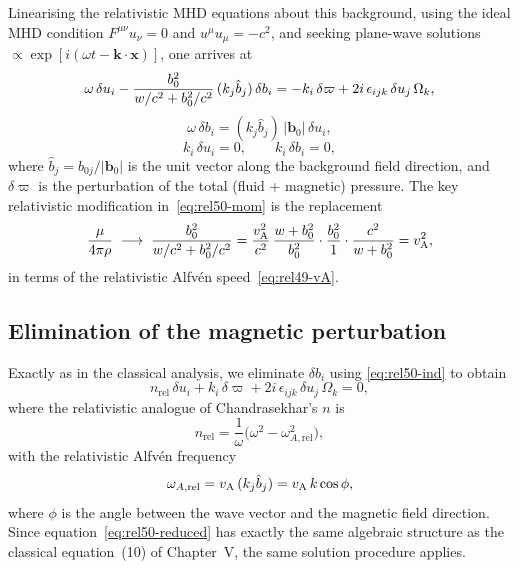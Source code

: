 Linearising the relativistic MHD equations about this background, using
the ideal MHD condition $F^{\mu\nu}u_{\nu}=0$ and
$u^{\mu}u_{\mu}=-c^{2}$, and seeking plane-wave solutions
$\propto\exp[i(\omega t - \mathbf{k}\cdot\mathbf{x})]$, one arrives at
\begin{equation}
  \omega\,\delta u_{i}
    - \frac{b_{0}^{2}}{w/c^{2}+b_{0}^{2}/c^{2}}
      \,(k_{j}\hat{b}_{j})\,\delta b_{i}
    = -k_{i}\,\delta\varpi
      + 2i\,\epsilon_{ijk}\,\delta u_{j}\,\Omega_{k},
  \label{eq:rel50-mom}
\end{equation}
\begin{equation}
  \omega\,\delta b_{i}
    = (k_{j}\hat{b}_{j})\,|\mathbf{b}_{0}|\,\delta u_{i},
  \label{eq:rel50-ind}
\end{equation}
\begin{equation}
  k_{i}\,\delta u_{i} = 0,
  \qquad
  k_{i}\,\delta b_{i} = 0,
  \label{eq:rel50-div}
\end{equation}
where $\hat{b}_{j}=b_{0j}/|\mathbf{b}_{0}|$ is the unit vector along
the background field direction, and
$\delta\varpi$ is the perturbation of the total (fluid + magnetic)
pressure.  The key relativistic modification in~\eqref{eq:rel50-mom} is
the replacement
\begin{equation}
  \frac{\mu}{4\pi\rho}
  \;\longrightarrow\;
  \frac{b_{0}^{2}}{w/c^{2}+b_{0}^{2}/c^{2}}
  = \frac{v_{\mathrm{A}}^{2}}{c^{2}}\,\frac{w+b_{0}^{2}}{b_{0}^{2}}\cdot
    \frac{b_{0}^{2}}{1} \cdot\frac{c^{2}}{w+b_{0}^{2}}
  = v_{\mathrm{A}}^{2},
  \label{eq:rel50-replacement}
\end{equation}
in terms of the relativistic Alfv\'en speed~\eqref{eq:rel49-vA}.

\subsection{Elimination of the magnetic perturbation}

Exactly as in the classical analysis, we eliminate $\delta b_{i}$ using
\eqref{eq:rel50-ind} to obtain
\begin{equation}
  n_{\mathrm{rel}}\,\delta u_{i}
    + k_{i}\,\delta\varpi
    + 2i\,\epsilon_{ijk}\,\delta u_{j}\,\Omega_{k} = 0,
  \label{eq:rel50-reduced}
\end{equation}
where the relativistic analogue of Chandrasekhar's $n$ is
\begin{equation}
  n_{\mathrm{rel}}
    = \frac{1}{\omega}
      \bigl(\omega^{2} - \omega_{A,\mathrm{rel}}^{2}\bigr),
  \label{eq:rel50-n}
\end{equation}
with the relativistic Alfv\'en frequency
\begin{equation}
  \omega_{A,\mathrm{rel}}
    = v_{\mathrm{A}}\,(k_{j}\hat{b}_{j})
    = v_{\mathrm{A}}\,k\cos\phi,
  \label{eq:rel50-omegaA}
\end{equation}
where $\phi$ is the angle between the wave vector and the magnetic field
direction.  Since equation~\eqref{eq:rel50-reduced} has exactly the same
algebraic structure as the classical equation~(10) of Chapter~V, the same
solution procedure applies.

